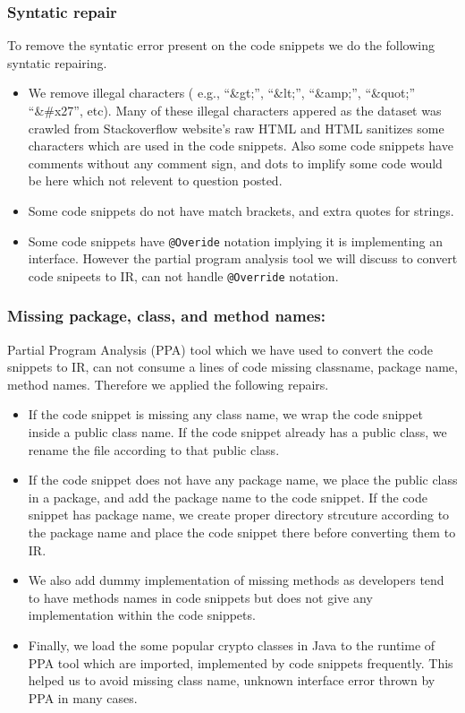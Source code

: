 \subsubsection{Syntatic repair}
To remove the syntatic error present on the code snippets we do the following syntatic repairing.
  \begin{itemize}
    \item We remove illegal characters ( e.g., ``\&gt;'', ``\&lt;'', ``\&amp;'', ``\&quot;'' ``\&\#x27'', etc). Many of these illegal characters appered as the dataset was crawled from Stackoverflow website's raw HTML and HTML sanitizes some characters which are used in the code snippets. Also some code snippets have comments without any comment sign, and dots to implify some code would be here which not relevent to question posted.    
    \item Some code snippets do not have match brackets, and extra quotes for strings. 
    \item Some code snippets have \texttt{@Overide} notation implying it is implementing an interface. However the partial program analysis tool we will discuss to convert code snipeets to IR, can not handle \texttt{@Override} notation.
  \end{itemize}
     

\subsubsection{Missing package, class, and method names:}
Partial Program Analysis (PPA) tool which we have used to convert the code snippets to IR, can not consume a lines  of code missing classname, package name, method names. Therefore we applied the following repairs. 
\begin{itemize}
\item If the code snippet is missing any class name, we wrap the code snippet inside a public class name. If the code snippet already has a public class, we rename the file according to that public class.
\item If the code snippet does not have any package name, we place the public class in a package, and add the package name to the code snippet. If the code snippet has package name, we create proper directory strcuture according to the package name and place the code snippet there before converting them to IR. 
\item We also add dummy implementation of missing methods as developers tend to have methods names  in code snippets but does not give any implementation within the code snippets.
\item Finally, we load the some popular crypto classes in Java to the runtime of PPA tool which are imported, implemented by code snippets frequently. This helped us to avoid missing class name, unknown interface error thrown by PPA in many cases.  
 
\end{itemize}
       
